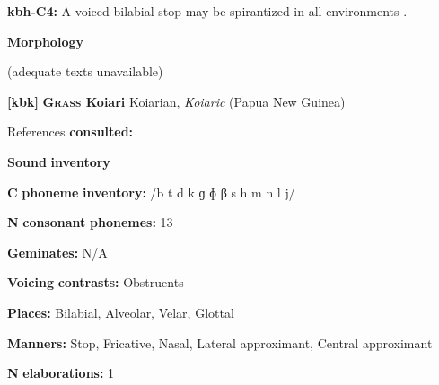 \documentclass[output=paper]{langsci/langscibook}
\begin{document}
\begin{styleBody}
\textbf{kbh-C4:} A voiced bilabial stop may be spirantized in all environments \citep[77]{Howard1967}.
\end{styleBody}

\begin{styleBody}
\textbf{Morphology}
\end{styleBody}

\begin{styleBody}
(adequate texts unavailable)
\end{styleBody}

\begin{styleBody}
\textbf{[kbk]}   \textbf{\textsc{Grass} \textbf{Koiari}}    Koiarian, \textit{Koiaric} (Papua New Guinea)
\end{styleBody}

\begin{styleBody}
References \textbf{consulted:} \citet{Dutton1996}
\end{styleBody}

\begin{styleBody}
\textbf{Sound} \textbf{inventory}
\end{styleBody}

\begin{styleBody}
\textbf{C} \textbf{phoneme} \textbf{inventory:} /b t d k ɡ ɸ β s h m n l j/
\end{styleBody}

\begin{styleBody}
\textbf{N} \textbf{consonant} \textbf{phonemes:} 13
\end{styleBody}

\begin{styleBody}
\textbf{Geminates:} N/A
\end{styleBody}

\begin{styleBody}
\textbf{Voicing} \textbf{contrasts:} Obstruents
\end{styleBody}

\begin{styleBody}
\textbf{Places:} Bilabial, Alveolar, Velar, Glottal
\end{styleBody}

\begin{styleBody}
\textbf{Manners:} Stop, Fricative, Nasal, Lateral approximant, Central approximant
\end{styleBody}

\begin{styleBody}
\textbf{N} \textbf{elaborations:} 1
\end{styleBody}
\end{document}
